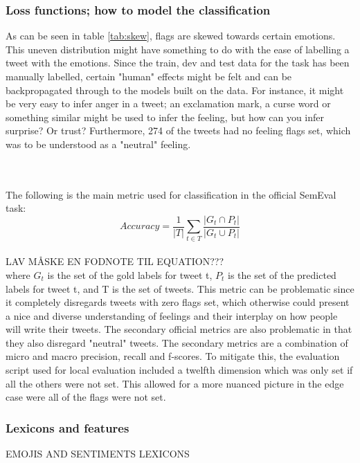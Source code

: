 \subsubsection{Loss functions; how to model the classification}
As can be seen in table \ref{tab:skew}, flags are skewed towards certain emotions. This uneven distribution might have something to do with the ease of labelling a tweet with the emotions. Since the train, dev and test data for the task has been manually labelled, certain "human" effects might be felt and can be backpropagated through to the models built on the data. For instance, it might be very easy to infer anger in a tweet; an exclamation mark, a curse word or something similar might be used to infer the feeling, but how can you infer surprise? Or trust? Furthermore, 274 of the tweets had no feeling flags set, which was to be understood as a "neutral" feeling.\\
\begin{table}[h]
\caption{The actual flags set and percentage of the full classification dataset}
\label{tab:skew}
\end{table}\\
\\
The following is the main metric used for classification in the official SemEval task:\\
\begin{equation} \label{eq:accuracy}
Accuracy = \dfrac{1}{\lvert T \rvert} \sum_{t\in T}\dfrac{\lvert G_{t} \cap P_{t}\rvert}{\lvert G_{t} \cup P_{t}\rvert}
\end{equation}\\
LAV MÅSKE EN FODNOTE TIL EQUATION???\\
where $G_{t}$ is the set of the gold labels for tweet t, $P_{t}$ is the set of the predicted labels for tweet t, and T is the set of tweets. This metric can be problematic since it completely disregards tweets with zero flags set, which otherwise could present a nice and diverse understanding of feelings and their interplay on how people will write their tweets. The secondary official metrics are also problematic in that they also disregard "neutral" tweets. The secondary metrics are a combination of micro and macro precision, recall and f-scores. To mitigate this, the evaluation script used for local evaluation included a twelfth dimension which was only set if all the others were not set. This allowed for a more nuanced picture in the edge case were all of the flags were not set.

\subsubsection{Lexicons and features}
EMOJIS AND SENTIMENTS LEXICONS
